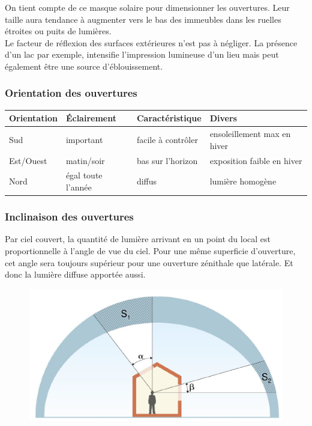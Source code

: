 \documentclass[11pt]{report}
\begin{document}
On tient compte de ce masque solaire pour dimensionner les ouvertures. Leur taille aura tendance à augmenter vers le bas des immeubles dans les ruelles étroites ou puits de lumières.\\


Le facteur de réflexion des surfaces extérieures n'est pas à négliger. La présence d'un lac par exemple, intensifie l'impression lumineuse d'un lieu mais peut également être une source d'éblouissement.





\subsubsection{Orientation des ouvertures}
\begin{center}
\begin{tabular}{llll}
\textbf{Orientation} & \textbf{Éclairement} & \textbf{Caractéristique} & \textbf{Divers}\\
\hline
Sud &  important & facile à contrôler & ensoleillement max en hiver\\
Est/Ouest & matin/soir & bas sur l'horizon & exposition faible en hiver\\
Nord & égal toute l'année & diffus & lumière homogène
\end{tabular}
\end{center}


\subsubsection{Inclinaison des ouvertures}
Par ciel couvert, la quantité de lumière arrivant en un point du local est proportionnelle à l'angle de vue du ciel. Pour une même superficie d'ouverture, cet angle sera toujours supérieur pour une ouverture zénithale que latérale. Et donc la lumière diffuse apportée aussi.

\begin{figure}[h]
\centering
\includegraphics[scale=0.3]{zen}
\end{figure}
\end{document}
